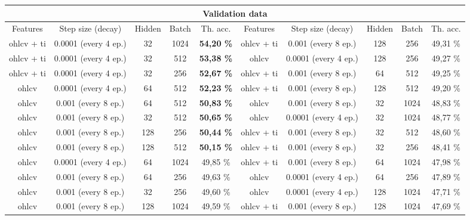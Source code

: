 \documentclass[10pt,twocolumn,letterpaper]{article}
\begin{document}
\begin{table}
\begin{center}
\begin{tabular}{ccccc|ccccc}
    \multicolumn{10}{c}{Validation data} \\
    \toprule
    Features & Step size (decay) & Hidden & Batch & Th. acc. & Features & Step size (decay) & Hidden & Batch & Th. acc. \\
    \midrule
    \cellcolor{lightgray}ohlcv + ti  & \cellcolor{lightgray}0.0001 (every 4 ep.) & \cellcolor{lightgray}32 & \cellcolor{lightgray}1024 & \cellcolor{lightgray}\textbf{54,20 \%} &  ohlcv + ti & 0.001 (every 8 ep.) & 128 & 256 & 49,31 \% \\
    \cellcolor{lightgray}ohlcv + ti & \cellcolor{lightgray}0.0001 (every 4 ep.) & \cellcolor{lightgray}32 & \cellcolor{lightgray}512 & \cellcolor{lightgray}\textbf{53,38 \%} & ohlcv & 0.0001 (every 4 ep.) & 128 & 256 & 49,27 \% \\
    \cellcolor{lightgray}ohlcv + ti & \cellcolor{lightgray}0.0001 (every 4 ep.) & \cellcolor{lightgray}32 & \cellcolor{lightgray}256 & \cellcolor{lightgray}\textbf{52,67 \%} & ohlcv + ti & 0.001 (every 8 ep.) & 64 & 512 & 49,25 \% \\
    ohlcv  & 0.0001 (every 4 ep.) & 64 & 512 & \textbf{52,23 \%} & ohlcv + ti & 0.001 (every 8 ep.) & 128 & 512 & 49,20 \% \\
    ohlcv & 0.001 (every 8 ep.) & 64 & 512 & \textbf{50,83 \%} & ohlcv & 0.001 (every 8 ep.) & 32 & 1024 & 48,83 \% \\
    ohlcv & 0.001 (every 8 ep.) & 32 & 512 & \textbf{50,65 \%} & ohlcv & 0.0001 (every 4 ep.) & 32 & 1024 & 48,77 \% \\
    ohlcv & 0.001 (every 8 ep.) & 128 & 256 & \textbf{50,44 \%} & ohlcv + ti & 0.001 (every 8 ep.) & 32 & 512 & 48,60 \% \\
    ohlcv & 0.001 (every 8 ep.) & 128 & 512 & \textbf{50,15 \%} & ohlcv + ti & 0.001 (every 8 ep.) & 32 & 256 & 48,41 \% \\
    ohlcv & 0.0001 (every 4 ep.) & 64 & 1024 & 49,85 \% & ohlcv + ti & 0.001 (every 8 ep.) & 64 & 1024 & 47,98 \% \\
    ohlcv & 0.001 (every 8 ep.) & 64 & 256 & 49,63 \% & ohlcv & 0.0001 (every 4 ep.) & 64 & 256 & 47,89 \% \\
    ohlcv & 0.001 (every 8 ep.) & 32 & 256 & 49,60 \% & ohlcv & 0.0001 (every 4 ep.) & 128 & 1024 & 47,71 \% \\
    ohlcv & 0.001 (every 8 ep.) & 128 & 1024 & 49,59 \% & ohlcv + ti & 0.001 (every 8 ep.) & 128 & 1024 & 47,69 \% \\

\end{tabular}
\end{center}
\end{table}
\end{document}
